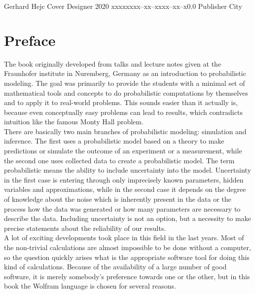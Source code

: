 \documentclass{tstextbook}
\begin{document}
       {Gerhard Hejc}
       {Cover Designer}
       {2020}
       {xxxxx}{xxx--xx--xxxx--xx--x}{0.0}
       {Publisher}
       {City}

\chapter{Preface}

The book originally developed from talks and lecture notes given at the Fraunhofer institute in Nuremberg, Germany as an introduction to probabilistic modeling. The goal was primarily to provide the students with a minimal set of mathematical tools and concepts to do probabilistic computations by themselves and to apply it to real-world problems. This sounds easier than it actually is, because even conceptually easy problems can lead to results, which contradicts intuition like the famous Monty Hall problem.\\

There are basically two main branches of probabilistic modeling: simulation and inference. The first uses a probabilistic model based on a theory to make predictions or simulate the outcome of an experiment or a measurement, while the second one uses collected data to create a probabilistic model. The term probabilistic means the ability to include uncertainty into the model. Uncertainty in the first case is entering through only imprecisely known parameters,  hidden variables and approximations, while in the second case it depends on the degree of knowledge about the noise which is inherently present in the data or the process how the data was generated or how many parameters are necessary to describe the data. Including uncertainty is not an option, but a necessity to make precise statements about the reliability of our results.  \\    

A lot of exciting developments took place in this field in the last years. Most of the non-trivial calculations are almost impossible to be done without a computer, so the question quickly arises what is the appropriate software tool for doing this kind of calculations. Because of the availability of a large number of good software, it is merely somebody's preference towards one or the other, but in this book the Wolfram language is chosen for several reasons.\\
\end{document}
